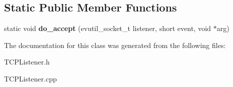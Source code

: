 \subsection*{Static Public Member Functions}
\begin{DoxyCompactItemize}
\item 
\hypertarget{class_t_c_p_listener_af39a0d5b95386644c7a22966301f4bc0}{}static void {\bfseries do\+\_\+accept} (evutil\+\_\+socket\+\_\+t listener, short event, void $\ast$arg)\label{class_t_c_p_listener_af39a0d5b95386644c7a22966301f4bc0}

\end{DoxyCompactItemize}


The documentation for this class was generated from the following files\+:\begin{DoxyCompactItemize}
\item 
T\+C\+P\+Listener.\+h\item 
T\+C\+P\+Listener.\+cpp\end{DoxyCompactItemize}
